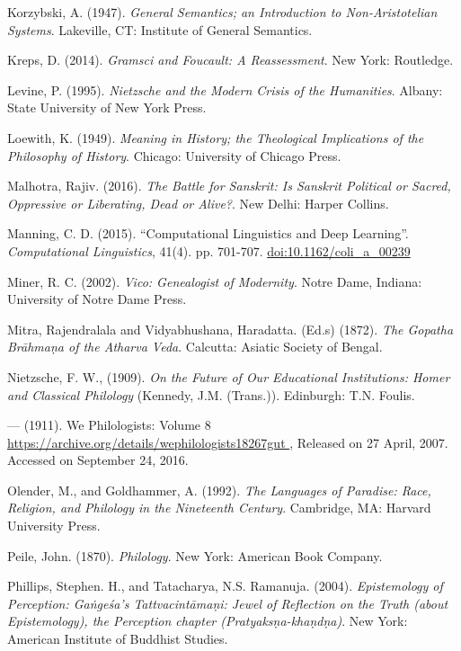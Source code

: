 \begin{thebibliography}{99}
  Korzybski, A. (1947). \textit{General Semantics; an Introduction to Non-Aristotelian Systems}. Lakeville, CT: Institute of General Semantics.

  Kreps, D. (2014). \textit{Gramsci and Foucault: A Reassessment}. New York: Routledge.

  Levine, P. (1995). \textit{Nietzsche and the Modern Crisis of the Humanities}. Albany: State University of New York Press.

  Loewith, K. (1949). \textit{Meaning in History; the Theological Implications of the Philosophy of History}. Chicago: University of Chicago Press.

  Malhotra, Rajiv. (2016). \textit{The Battle for Sanskrit: Is Sanskrit Political or Sacred, Oppressive or Liberating, Dead or Alive?}. New Delhi: Harper Collins.

  Manning, C. D. (2015). “Computational Linguistics and Deep Learning”. \textit{Computational Linguistics}, 41(4). pp. 701-707. \url{doi:10.1162/coli_a_00239}

  Miner, R. C. (2002). \textit{Vico: Genealogist of Modernity}. Notre Dame, Indiana: University of Notre Dame Press.

  Mitra, Rajendralala and Vidyabhushana, Haradatta. (Ed.s) (1872). \textit{The Gopatha Brāhmaṇa of the Atharva Veda}. Calcutta: Asiatic Society of Bengal.

  Nietzsche, F. W., (1909). \textit{On the Future of Our Educational Institutions: Homer and Classical Philology} (Kennedy, J.M. (Trans.)). Edinburgh: T.N. Foulis.

  — (1911). We Philologists: Volume 8 \url{ https://archive.org/details/wephilologists18267gut }, Released on 27 April, 2007. Accessed on September 24, 2016.

  Olender, M., and Goldhammer, A. (1992). \textit{The Languages of Paradise: Race, Religion, and Philology in the Nineteenth Century}. Cambridge, MA: Harvard University Press.

  Peile, John. (1870). \textit{Philology}. New York: American Book Company.

  Phillips, Stephen. H., and Tatacharya, N.S. Ramanuja. (2004). \textit{Epistemology of Perception: Gaṅgeśa's Tattvacintāmaṇi: Jewel of Reflection on the Truth (about Epistemology), the Perception chapter (Pratyaksṇa-khaṇdṇa)}. New York: American Institute of Buddhist Studies.


\end{thebibliography}
